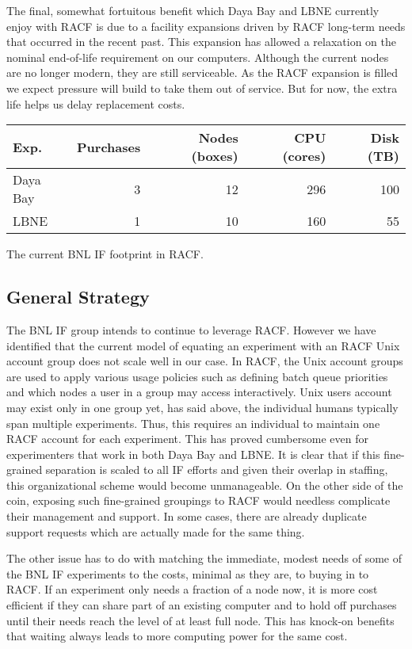 \documentclass[pdftex,12pt,letter]{article}
\begin{document}
The final, somewhat fortuitous benefit which Daya Bay and LBNE
currently enjoy with RACF is due to a facility expansions driven by
RACF long-term needs that occurred in the recent past.
This expansion has allowed a relaxation on the nominal end-of-life
requirement on our computers.
Although the current nodes are no longer modern, they are still
serviceable. 
As the RACF expansion is filled we expect pressure will build to take
them out of service.
But for now, the extra life helps us delay replacement costs.

\begin{center}
\begin{tabular}[h]{|l|r|r|r|r|}
  \hline
  Exp. & Purchases & Nodes (boxes) & CPU (cores) & Disk (TB) \\
  \hline
  Daya Bay & 3 & 12 & 296 & 100 \\
  \hline
  LBNE & 1 & 10 & 160 & 55 \\
  \hline
\end{tabular}

The current BNL IF footprint in RACF.
\end{center}

\subsection{General Strategy}

The BNL IF group intends to continue to leverage RACF.
However we have identified that the current model of equating an
experiment with an RACF Unix account group does not scale well in our
case.
In RACF, the Unix account groups are used to apply various usage
policies such as defining batch queue priorities and which nodes a
user in a group may access interactively.
Unix users account may exist only in one group yet, has said above,
the individual humans typically span multiple experiments.
Thus, this requires an individual to maintain one RACF account for
each experiment.
This has proved cumbersome even for experimenters that work in both
Daya Bay and LBNE.
It is clear that if this fine-grained separation is scaled to all IF
efforts and given their overlap in staffing, this organizational
scheme would become unmanageable.
On the other side of the coin, exposing such fine-grained groupings to
RACF would needless complicate their management and support.
In some cases, there are already duplicate support requests which are
actually made for the same thing.

The other issue has to do with matching the immediate, modest needs of
some of the BNL IF experiments to the costs, minimal as they are, to
buying in to RACF.
If an experiment only needs a fraction of a node now, it is more cost
efficient if they can share part of an existing computer and to hold
off purchases until their needs reach the level of at least full node.
This has knock-on benefits that waiting always leads to more computing
power for the same cost.
\end{document}
